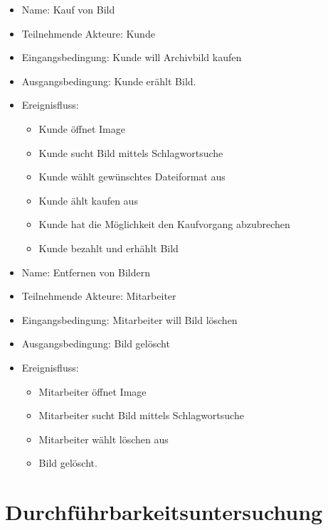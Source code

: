 \documentclass[parskip=full]{scrartcl}
\begin{document}
\begin{itemize}


\item Name: Kauf von Bild   

\item Teilnehmende Akteure: Kunde

\item Eingangsbedingung: Kunde will Archivbild kaufen

\item Ausgangsbedingung: Kunde er\"ahlt Bild.

\item Ereignisfluss: 
\begin{itemize}
\item Kunde \"offnet Image
\item Kunde sucht Bild mittels Schlagwortsuche
\item Kunde w\"ahlt gew\"unschtes Dateiformat aus
\item Kunde \"ahlt kaufen aus
\item Kunde hat die M\"oglichkeit den Kaufvorgang abzubrechen
\item Kunde bezahlt und erh\"ahlt Bild
\end{itemize}

\end{itemize}

\begin{itemize}


\item Name: Entfernen von Bildern

\item Teilnehmende Akteure: Mitarbeiter

\item Eingangsbedingung: Mitarbeiter will Bild l\"oschen

\item Ausgangsbedingung: Bild gel\"oscht

\item Ereignisfluss: 
\begin{itemize}
\item Mitarbeiter \"offnet Image
\item Mitarbeiter sucht Bild mittels Schlagwortsuche
\item Mitarbeiter w\"ahlt l\"oschen aus
\item Bild gel\"oscht.
\end{itemize}

\end{itemize}

\section{Durchführbarkeitsuntersuchung}
\end{document}
